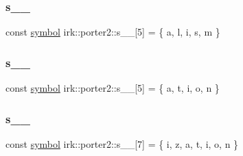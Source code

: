 \mbox{\label{namespaceirk_1_1porter2_af56db2b29e1a637051968303ad6e58b1}} 
\subsubsection{\texorpdfstring{s\+\_\+\_}{s\_5\_16}}
{\footnotesize\ttfamily const \mbox{\hyperlink{namespaceirk_1_1porter2_afd04c4eb58a1dabcf8f3ab2d7e9f9ed5}{symbol}} irk\+::porter2\+::s\+\_\+\_\mbox{[}5\mbox{]} = \{ \textquotesingle{}a\textquotesingle{}, \textquotesingle{}l\textquotesingle{}, \textquotesingle{}i\textquotesingle{}, \textquotesingle{}s\textquotesingle{}, \textquotesingle{}m\textquotesingle{} \}\hspace{0.3cm}{\ttfamily [static]}}

\mbox{\label{namespaceirk_1_1porter2_ac7333127e9f922dadb158a128c710619}} 
\subsubsection{\texorpdfstring{s\+\_\+\_}{s\_5\_17}}
{\footnotesize\ttfamily const \mbox{\hyperlink{namespaceirk_1_1porter2_afd04c4eb58a1dabcf8f3ab2d7e9f9ed5}{symbol}} irk\+::porter2\+::s\+\_\+\_\mbox{[}5\mbox{]} = \{ \textquotesingle{}a\textquotesingle{}, \textquotesingle{}t\textquotesingle{}, \textquotesingle{}i\textquotesingle{}, \textquotesingle{}o\textquotesingle{}, \textquotesingle{}n\textquotesingle{} \}\hspace{0.3cm}{\ttfamily [static]}}

\mbox{\label{namespaceirk_1_1porter2_a13cdb82afbea93edbd4304efeaadb025}} 
\subsubsection{\texorpdfstring{s\+\_\+\_}{s\_5\_18}}
{\footnotesize\ttfamily const \mbox{\hyperlink{namespaceirk_1_1porter2_afd04c4eb58a1dabcf8f3ab2d7e9f9ed5}{symbol}} irk\+::porter2\+::s\+\_\+\_\mbox{[}7\mbox{]} = \{ \textquotesingle{}i\textquotesingle{}, \textquotesingle{}z\textquotesingle{}, \textquotesingle{}a\textquotesingle{}, \textquotesingle{}t\textquotesingle{}, \textquotesingle{}i\textquotesingle{}, \textquotesingle{}o\textquotesingle{}, \textquotesingle{}n\textquotesingle{} \}\hspace{0.3cm}{\ttfamily [static]}}

